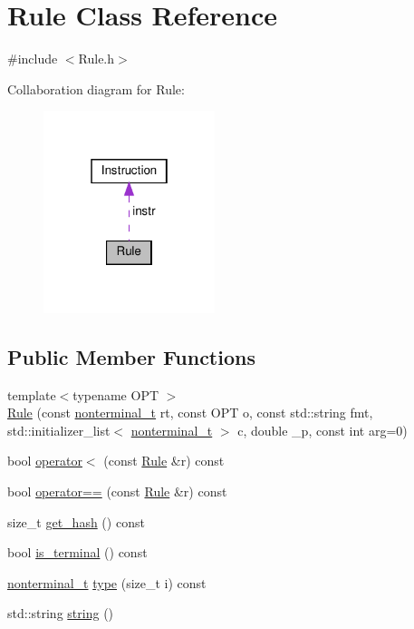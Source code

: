 \hypertarget{class_rule}{}\section{Rule Class Reference}
\label{class_rule}


{\ttfamily \#include $<$Rule.\+h$>$}



Collaboration diagram for Rule\+:\nopagebreak
\begin{figure}[H]
\begin{center}
\leavevmode
\includegraphics[width=142pt]{class_rule__coll__graph}
\end{center}
\end{figure}
\subsection*{Public Member Functions}
\begin{DoxyCompactItemize}
\item 
{\footnotesize template$<$typename O\+PT $>$ }\\\hyperlink{class_rule_a1e65fa1bce404b1513038a9dd4ffcb9f}{Rule} (const \hyperlink{_nonterminal_8h_a5c1f658dc7560600a16d22408bd716ca}{nonterminal\+\_\+t} rt, const O\+PT o, const std\+::string fmt, std\+::initializer\+\_\+list$<$ \hyperlink{_nonterminal_8h_a5c1f658dc7560600a16d22408bd716ca}{nonterminal\+\_\+t} $>$ c, double \+\_\+p, const int arg=0)
\item 
bool \hyperlink{class_rule_a706819fbede2c5a1b0b59f1d28cae30b}{operator$<$} (const \hyperlink{class_rule}{Rule} \&r) const
\item 
bool \hyperlink{class_rule_a183fafc8a6b43515436a1de8f63ec98d}{operator==} (const \hyperlink{class_rule}{Rule} \&r) const
\item 
size\+\_\+t \hyperlink{class_rule_a62e4d931266a65d4aad9ca3c058d7e25}{get\+\_\+hash} () const
\item 
bool \hyperlink{class_rule_a9d557e302f94bd85f5505733e8856f97}{is\+\_\+terminal} () const
\item 
\hyperlink{_nonterminal_8h_a5c1f658dc7560600a16d22408bd716ca}{nonterminal\+\_\+t} \hyperlink{class_rule_a97db8e22bb8445b92779eb165bb29ae5}{type} (size\+\_\+t i) const
\item 
std\+::string \hyperlink{class_rule_a4a75588d7821c1bcf087ec6ebf82bd0f}{string} ()
\end{DoxyCompactItemize}
